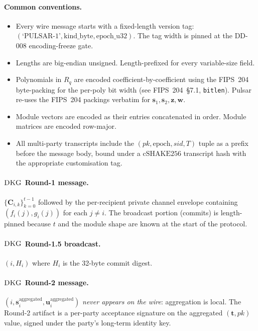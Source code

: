 \documentclass[11pt,a4paper]{article}
\theoremstyle{definition}
\theoremstyle{remark}
\newcommand{\Rq}{R_q}
\newcommand{\cSHAKE}{\mathrm{cSHAKE256}}
\newcommand{\DKG}{\textsc{DKG}}
\begin{document}
\paragraph{Common conventions.}
\begin{itemize}[leftmargin=*, itemsep=0pt]
\item Every wire message starts with a fixed-length version tag:
$(\text{`PULSAR-1'}, \text{kind\_byte}, \text{epoch\_u32})$.
The tag width is pinned at the DD-008 encoding-freeze gate.
\item Lengths are big-endian unsigned. Length-prefixed for every
variable-size field.
\item Polynomials in $\Rq$ are encoded coefficient-by-coefficient
using the FIPS~204 byte-packing for the per-poly bit width (see
FIPS~204~\S7.1, \texttt{bitlen}). Pulsar re-uses the FIPS~204
packings verbatim for $\mathbf{s}_1, \mathbf{s}_2, \mathbf{z}, \mathbf{w}$.
\item Module vectors are encoded as their entries concatenated in
order. Module matrices are encoded row-major.
\item All multi-party transcripts include the
$(\mathit{pk}, \text{epoch}, \mathit{sid}, T)$ tuple as a
prefix before the message body, bound under a $\cSHAKE$ transcript
hash with the appropriate customisation tag.
\end{itemize}

\paragraph{$\DKG$ Round-1 message.}
\(\{\mathbf{C}_{i,k}\}_{k=0}^{t-1}\) followed by the per-recipient
private channel envelope containing $(f_i(j), g_i(j))$ for each
$j \ne i$. The broadcast portion (commits) is length-pinned because
$t$ and the module shape are known at the start of the protocol.

\paragraph{$\DKG$ Round-1.5 broadcast.}
$(i, H_i)$ where $H_i$ is the 32-byte commit digest.

\paragraph{$\DKG$ Round-2 message.}
$(i, \mathbf{s}_i^{\mathrm{aggregated}}, \mathbf{u}_i^{\mathrm{aggregated}})$
\emph{never appears on the wire}: aggregation is local. The Round-2
artifact is a per-party acceptance signature on the aggregated
$(\mathbf{t}, \mathit{pk})$ value, signed under the party's long-term
identity key.
\end{document}
